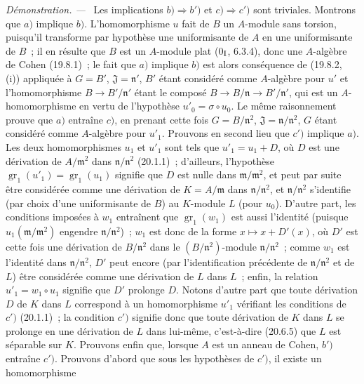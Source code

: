 \documentclass[10pt,oneside]{book}
\newenvironment{proof}{%
  \par\medskip\noindent\textit{Démonstration. ---\ }}{\par}
\begin{document}
\begin{proof}
Les implications $b)\Rightarrow b')$ et $c)\Rightarrow c')$ sont triviales.
Montrons que $a)$ implique $b)$.
L'homomorphisme $u$ fait de $B$ un $A$-module sans torsion, puisqu'il
transforme par hypothèse une uniformisante de $A$ en une uniformisante de $B$~;
il en résulte que $B$ est un $A$-module plat (0$_{\rm I}$, 6.3.4), donc une
$A$-algèbre de Cohen (19.8.1)~; le fait que $a)$ implique $b)$ est alors
 conséquence de (19.8.2, (i)) appliquée à $G=B'$, $\mathfrak J=\mathfrak n'$,
 $B'$ étant considéré comme $A$-algèbre pour $u'$ et l'homomorphisme
$B\to B'/\mathfrak n'$ étant le composé
$B\to B/\mathfrak n\to B'/\mathfrak n'$, qui est un $A$-homomorphisme en
 vertu de l'hypothèse $u'_0=\sigma\circ u_0$. Le même raisonnement prouve que
$a)$ entraîne $c)$, en prenant cette fois $G=B/\mathfrak n^2$,
$\mathfrak J=\mathfrak n/\mathfrak n^2$, $G$ étant considéré comme
$A$-algèbre pour $u'_1$.
Prouvons en second lieu que $c')$ implique $a)$. Les deux homomorphismes
$u_1$ et $u'_1$ sont tels que $u'_1=u_1+D$, où $D$ est une dérivation de
$A/\mathfrak m^2$ dans $\mathfrak n/\mathfrak n^2$ (20.1.1)~; d'ailleurs,
l'hypothèse $\operatorname{gr}_1(u'_1)=\operatorname{gr}_1(u_1)$ signifie
que $D$ est nulle dans $\mathfrak m/\mathfrak m^2$, et peut par suite être
considérée comme une dérivation de $K=A/\mathfrak m$ dans
$\mathfrak n/\mathfrak n^2$, et $\mathfrak n/\mathfrak n^2$ s'identifie
(par choix d'une uniformisante de $B$) au $K$-module $L$ (pour $u_0$).
D'autre part, les conditions imposées à $w_1$ entraînent que
 $\operatorname{gr}_1(w_1)$ est aussi l'identité (puisque
 $u_1(\mathfrak m/\mathfrak m^2)$ engendre
$\mathfrak n/\mathfrak n^2$)~; $w_1$ est donc de la forme
$x\mapsto x+D'(x)$, où $D'$ est cette fois une dérivation de
$B/\mathfrak n^2$ dans le $(B/\mathfrak n^2)$-module
$\mathfrak n/\mathfrak n^2$~; comme $w_1$ est l'identité dans
$\mathfrak n/\mathfrak n^2$, $D'$ peut encore (par l'identification
précédente de $\mathfrak n/\mathfrak n^2$ et de $L$) être considérée comme
une dérivation de $L$ dans $L$~; enfin, la relation $u'_1=w_1\circ u_1$
signifie que $D'$ prolonge $D$. Notons d'autre part que toute dérivation $D$
de $K$ dans $L$ correspond à un homomorphisme $u'_1$ vérifiant les conditions
de $c')$ (20.1.1)~; la condition $c')$ signifie donc que toute dérivation de
$K$ dans $L$ se prolonge en une dérivation de $L$ dans lui-même, c'est-à-dire
(20.6.5) que $L$ est séparable sur $K$.
Prouvons enfin que, lorsque $A$ est un anneau de Cohen, $b')$ entraîne $c')$.
Prouvons d'abord que sous les hypothèses de $c')$, il existe un homomorphisme

\end{proof}
\end{document}
